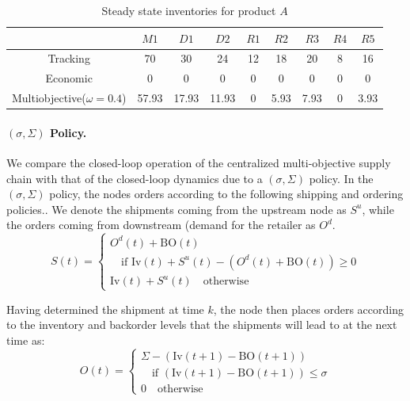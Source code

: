 \documentclass[10pt]{article}
\newcommand{\BO}{\textrm{BO}}
\newcommand{\Inv}{\textrm{Iv}}
\theoremstyle{definition}
\begin{document}
\begin{table}
\caption{Steady state  inventories for product $A$}
\label{tab:steady}
\begin{center}
\begin{tabular}{ccccccccc}\toprule
& $M1$ & $D1$ & $D2$  & $R1$ & $R2$ & $R3$ & $R4$ & $R5$ \\
\midrule
Tracking                      &70   &30   &24   &12&18  &20  &8&16 \\
Economic                      &0    &0    &0    &0 &0   &0   &0&0   \\
Multiobjective($\omega = 0.4$)&57.93&17.93&11.93&0 &5.93&7.93&0&3.93\\
\bottomrule
\end{tabular}
\end{center}
\end{table}

\paragraph{$(\sigma,\Sigma) $ Policy.} We compare the closed-loop operation of
the centralized multi-objective supply chain with that of the
closed-loop dynamics due to a $(\sigma,\Sigma) $ policy. In the $(\sigma,\Sigma) $
policy, the nodes orders according to the
following shipping and ordering policies.. We denote the shipments coming from the upstream
node as $S^{u}$, while the orders coming from downstream (demand for
the retailer as $O^{d}$.
\begin{equation}
S(t) = \begin{cases} O^{d}(t)+\BO(t) \\\quad \text{if~}
  \Inv(t)+S^{u}(t)-(O^{d}(t)+\BO(t)) \geq 0 \\
  \Inv(t)+S^{u}(t)\quad \text{otherwise}
  \end{cases}
\end{equation}

Having determined the shipment at time $k$, the node then places
orders according to the inventory and backorder levels that the
shipments will lead to at the next time as:
\begin{equation}
O(t) = \begin{cases} \Sigma - (\Inv(t+1)-\BO(t+1))\\ \quad
  \text{if~} (\Inv(t+1)-\BO(t+1)) \leq \sigma\\
0 \quad \text{otherwise~}
\end{cases}
\end{equation}
\end{document}
